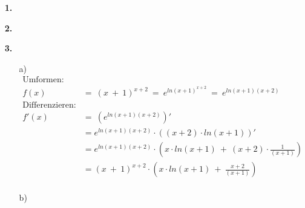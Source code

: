 \documentclass[a4paper,11pt]{article}
\title{\titleinfo}
\author{\authorinfotitle}
\date{\today}
\begin{document}
\maketitle
    \begin{enumerate}
        \item[\textbf{1.}]
            \todo
              
        \item[\textbf{2.}]
        	\todo
        \item[\textbf{3.}]
            \begin{enumerate}
            \item[{a)}]
                    \begin{align*}
                    \text{Umformen:}& \\
                    f(x) \ &= \ (x\ +\ 1)^{x+2} \ = \ e^{ln(x+1)^{x+2}} \ = \  e^{ln(x+1)(x+2)} \\
                    \text{Differenzieren:}& \\
                    f'(x) \ &= \  \left(e^{ln(x+1)(x+2)} \right)'  \\
                    &=  e^{ln(x+1)(x+2)} \cdot \left((x+2) \cdot ln(x+1)\right)'  \\
                    &= e^{ln(x+1)(x+2)} \cdot \left(x \cdot ln(x+1) \ +\ (x+2)\cdot \frac{1}{(x+1)}\right) \\
                    &= (x\ +\ 1)^{x+2} \cdot \left(x \cdot ln(x+1) \ +\ \frac{x+2}{(x+1)}\right) \\
                    \end{align*}
             \item[{b)}]
                    \begin{enumerate}


\end{enumerate}
\end{enumerate}
\end{enumerate}
\end{document}
